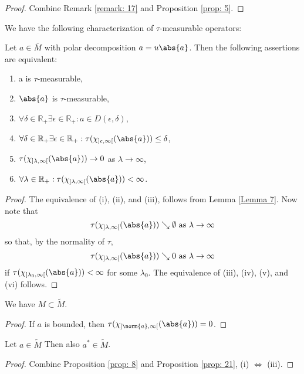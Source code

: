 \begin{proof}
    Combine Remark \ref{remark: 17} and Proposition \ref{prop: 5}.
\end{proof}
We have the following characterization of $\tau$-measurable operators: 
\begin{proposition}\label{prop: 21}
    Let $a\in \overline{M}$ with polar decomposition $a=u\abs{a}$. Then the following assertions are equivalent:
    \begin{enumerate}
        \item a is $\tau$-measurable, 
        \item $\abs{a}$ is $\tau$-measurable, 
        \item $\forall \delta\in \mathbb{R}_+ \exists \epsilon\in \mathbb{R}_+: a\in D(\epsilon,\delta)$,
        \item $\forall \delta\in \mathbb{R}_+ \exists \epsilon\in \mathbb{R}_+: \tau(\chi_{]\epsilon,\infty[}(\abs{a}))\leq \delta$,
        \item $\tau(\chi_{]\lambda,\infty[}(\abs{a}))\to 0$ as $\lambda\to \infty$,
        \item $\forall \lambda\in \mathbb{R}_+:\tau(\chi_{]\lambda,\infty[}(\abs{a}))<\infty$.
    \end{enumerate}
\end{proposition}
\begin{proof}
    The equivalence of (i), (ii), and (iii), follows from Lemma \ref{Lemma 7}. Now note that 
\[
    \tau(\chi_{]\lambda,\infty[}(\abs{a}))\searrow \emptyset \text{ as }\lambda\to \infty
\]
so that, by the normality of $\tau$, 
\[
    \tau(\chi_{]\lambda,\infty[}(\abs{a}))\searrow 0 \text{ as }\lambda\to \infty
\]
if $ \tau(\chi_{]\lambda_0,\infty[}(\abs{a}))<\infty$ for some $\lambda_0$. The equivalence of (iii), (iv), (v), and (vi) follows. 
\end{proof}
\begin{corollary}
    We have $M\subset \widetilde{M}$.
\end{corollary}
\begin{proof}
    If $a$ is bounded, then $\tau(\chi_{]\norm{a},\infty[}(\abs{a}))=0$.
\end{proof}
\begin{proposition}
    Let $a\in \widetilde{M}$ Then also $a^*\in \widetilde{M}$.
\end{proposition}
\begin{proof}
    Combine Proposition \ref{prop: 8} and Proposition \ref{prop: 21}, (i) $\Leftrightarrow$ (iii).
\end{proof}
